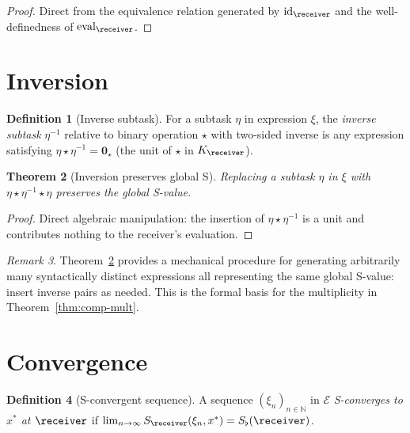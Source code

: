\documentclass[11pt,a4paper]{article}
\theoremstyle{thmstyle}
\newtheorem{theorem}{Theorem}[section]
\theoremstyle{thmstyle}
\theoremstyle{definition}
\newtheorem{definition}[theorem]{Definition}
\theoremstyle{remark}
\newtheorem{remark}[theorem]{Remark}
\DeclareMathOperator{\id}{id}
\DeclareMathOperator{\eval}{eval}
\newcommand{\Natural}{\mathbb{N}}
\newcommand{\Expr}{\mathcal{E}}
\newcommand{\Sscalar}{S}
\newcommand{\Sfloor}{S_{\flat}}
\begin{document}
\begin{proof}
Direct from the equivalence relation generated by
$\id_{\receiver}$ and the well-definedness of
$\eval_{\receiver}$.
\end{proof}

\section{Inversion}
\label{sec:inversion}

\begin{definition}[Inverse subtask]\label{def:inv-sub}
For a subtask $\eta$ in expression $\xi$, the
\emph{inverse subtask} $\eta^{-1}$ relative to
binary operation $\star$ with two-sided inverse
is any expression satisfying
$\eta \star \eta^{-1} = \mathbf{0}_{\star}$
(the unit of $\star$ in $K_{\receiver}$).
\end{definition}

\begin{theorem}[Inversion preserves global S]
\label{thm:inv-preserves-global}
Replacing a subtask $\eta$ in $\xi$ with
$\eta \star \eta^{-1} \star \eta$ preserves the
global S-value.
\end{theorem}

\begin{proof}
Direct algebraic manipulation: the insertion of
$\eta \star \eta^{-1}$ is a unit and contributes
nothing to the receiver's evaluation.
\end{proof}

\begin{remark}\label{rem:invertible-comp}
Theorem~\ref{thm:inv-preserves-global} provides a
mechanical procedure for generating arbitrarily
many syntactically distinct expressions all
representing the same global S-value: insert
inverse pairs as needed.  This is the formal
basis for the multiplicity in
Theorem~\ref{thm:comp-mult}.
\end{remark}

\section{Convergence}
\label{sec:convergence}

\begin{definition}[S-convergent sequence]\label{def:s-convergent}
A sequence $(\xi_{n})_{n \in \Natural}$ in $\Expr$
\emph{S-converges to $x^{*}$ at $\receiver$} if
$\lim_{n \to \infty} \Sscalar_{\receiver}(\xi_{n},
x^{*}) = \Sfloor(\receiver)$.
\end{definition}
\end{document}
